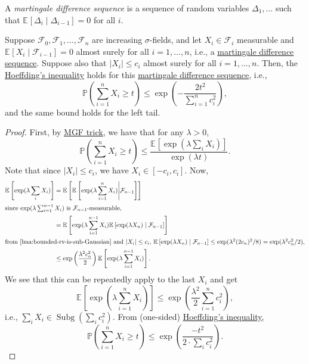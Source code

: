 \begin{definition}\label{def:martingale-difference-sequence}
	A \emph{martingale difference sequence} is a sequence of random variables \(\Delta _1, \dots \) such that \(\mathbb{E}_{}\left[\Delta _i \mid \Delta _{i-1} \right] = 0\) for all \(i\).
\end{definition}

\begin{theorem}\label{thm:Azuma-Hoeffding-inequality}
	Suppose \(\mathcal{F} _0, \mathcal{F} _1, \dots , \mathcal{F} _n \) are increasing \(\sigma \)-fields, and let \(X_i \in \mathcal{F} _i\) measurable and \(\mathbb{E}_{}\left[X_i \mid \mathcal{F} _{i-1} \right] = 0\) almost surely for all \(i=1, \dots , n\), i.e., a \hyperref[def:martingale-difference-sequence]{martingale difference sequence}. Suppose also that \(\vert X_i \vert \leq c_i\) almost surely for all \(i = 1, \dots , n\). Then, the \hyperref[thm:Hoeffding-inequality]{Hoeffding's inequality} holds for this \hyperref[def:martingale-difference-sequence]{martingale difference sequence}, i.e.,
	\[
		\mathbb{P} \left( \sum_{i=1}^{n} X_i \geq t \right) \leq \exp(- \frac{2t^2}{\sum_{i=1}^{n} c_i^2}),
	\]
	and the same bound holds for the left tail.
\end{theorem}
\begin{proof}
	First, by \hyperref[lma:MGF-trick]{MGF trick}, we have that for any \(\lambda >0\),
	\[
		\mathbb{P} \left( \sum_{i=1}^{n} X_i \geq t \right)
		\leq \frac{\mathbb{E}_{}\left[\exp (\lambda \sum_{i} X_i) \right] }{\exp (\lambda t)}.
	\]
	Note that since \(\vert X_i \vert \leq c_i\), we have \(X_i \in [- c_i, c_i]\). Now,
	\begin{align*}
		\mathbb{E}_{}\left[\exp (\lambda \sum_{i} X_i) \right]
		 & = \mathbb{E}_{}\left[\mathbb{E}_{}\left[\exp (\lambda \sum_{i=1}^n X_i ) \middle| \mathcal{F} _{n-1} \right]  \right]                  \\
		\shortintertext{since \(\exp (\lambda \sum_{i=1}^{n-1} X_i )\) is \(\mathcal{F} _{n-1}\)-measurable,}
		 & = \mathbb{E}_{}\left[\exp (\lambda \sum_{i=1}^{n-1} X_i) \mathbb{E}_{}\left[\exp (\lambda X_n) \mid \mathcal{F} _{n-1} \right] \right] \\
		\shortintertext{from \autoref{lma:bounded-rv-is-sub-Gaussian} and \(\vert X_i \vert \leq c_i\), \(\mathbb{E}_{}\left[\exp (\lambda X_n) \mid \mathcal{F} _{n-1} \right] \leq \exp (\lambda ^2 (2c_n)^2 / 8) = \exp (\lambda ^2 c_n^2 / 2)\),}
		 & \leq \exp \left( \frac{\lambda ^2 c_n^2}{2} \right) \mathbb{E}_{}\left[\exp (\lambda \sum_{i=1}^{n-1} X_i) \right].
	\end{align*}
	We see that this can be repeatedly apply to the last \(X_i\) and get
	\[
		\mathbb{E}_{}\left[\exp (\lambda \sum_{i=1}^{n} X_i) \right]
		\leq \exp \left( \frac{\lambda ^2}{2}\sum_{i=1}^{n} c_i^2 \right),
	\]
	i.e., \(\sum_{i} X_i\in \mathop{\mathrm{Subg}}(\sum_{i} c_i^2) \). From (one-sided) \hyperref[thm:Hoeffding-inequality]{Hoeffding's inequality},
	\[
		\mathbb{P} \left( \sum_{i=1}^{n} X_i \geq t \right)
		\leq \exp \left( \frac{-t^2}{2\cdot \sum_{i} c_i^2} \right).
	\]
\end{proof}

